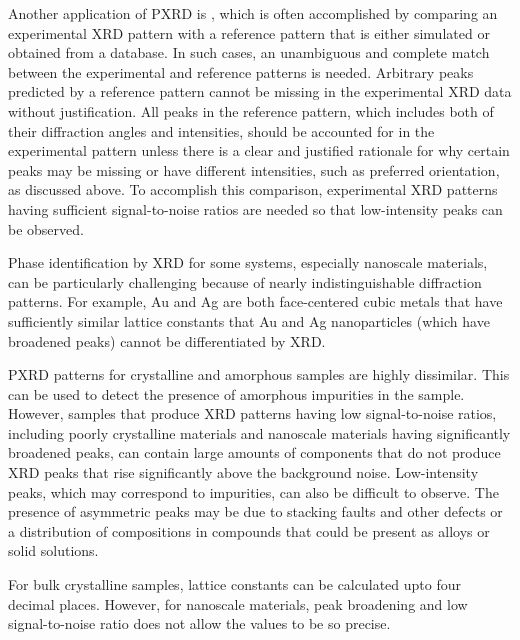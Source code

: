 Another application of PXRD is , which is often accomplished by comparing an experimental XRD pattern with a reference pattern that is either simulated or obtained from a database. In such cases, an unambiguous and complete match between the experimental and reference patterns is needed. Arbitrary peaks predicted by a reference pattern cannot be missing in the experimental XRD data without justification. All peaks in the reference pattern, which includes both of their diffraction angles and intensities, should be accounted for in the experimental pattern unless there is a clear and justified rationale for why certain peaks may be missing or have different intensities, such as preferred orientation, as discussed above. To accomplish this comparison, experimental XRD patterns having sufficient signal-to-noise ratios are needed so that low-intensity peaks can be observed.

Phase identification by XRD for some systems, especially nanoscale materials, can be particularly challenging because of nearly indistinguishable diffraction patterns. For example, Au and Ag are both face-centered cubic metals that have sufficiently similar lattice constants that Au and Ag nanoparticles (which have broadened peaks) cannot be differentiated by XRD.

PXRD patterns for crystalline and amorphous samples are highly dissimilar. This can be used to detect the presence of amorphous impurities in the sample. However, samples that produce XRD patterns having low signal-to-noise ratios, including poorly crystalline materials and nanoscale materials having significantly broadened peaks, can contain large amounts of components that do not produce XRD peaks that rise significantly above the background noise. Low-intensity peaks, which may correspond to impurities, can also be difficult to observe. The presence of asymmetric peaks may be due to stacking faults and other defects or a distribution of compositions in compounds that could be present as alloys or solid solutions.

For bulk crystalline samples, lattice constants can be calculated upto four decimal places. However, for nanoscale materials, peak broadening and low signal-to-noise ratio does not allow the values to be so precise.